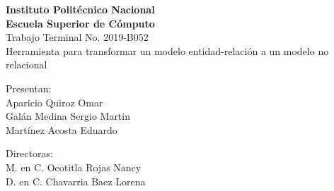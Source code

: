 \begin{titlepage}
    \begin{center}
        \vspace*{1cm}
        
        \Large
        \textbf{Instituto Politécnico Nacional}\\
        \textbf{Escuela Superior de Cómputo}\\
        
        \vspace{0.5cm}
        \LARGE
        Trabajo Terminal No. 2019-B052\\
        \vspace{1cm}
        Herramienta para transformar un modelo entidad-relación a un modelo no relacional

        \vspace{1.5cm}
        \begin{center}
            
            Presentan: \\
            Aparicio Quiroz Omar\\
            Galán Medina Sergio Martin\\
            Martínez Acosta Eduardo\\
            
            \vfill
            
            Directoras:\\
            M. en C. Ocotitla Rojas Nancy\\
            D. en C. Chavarria Baez Lorena
            
            \vspace{0.8cm}
            
        \end{center}

    \end{center}
\end{titlepage}
